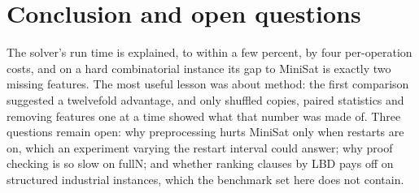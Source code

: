 \section{Conclusion and open questions}
\label{sec:limitations}

The solver's run time is explained, to within a few percent, by four
per-operation costs, and on a hard combinatorial instance its gap to MiniSat
is exactly two missing features. The most useful lesson was about method: the
first comparison suggested a twelvefold advantage, and only shuffled copies,
paired statistics and removing features one at a time showed what that number
was made of. Three questions remain open: why preprocessing hurts MiniSat only
when restarts are on, which an experiment varying the restart interval could
answer; why proof checking is so slow on fullN; and whether ranking clauses by
LBD pays off on structured industrial instances, which the benchmark set here
does not contain.
